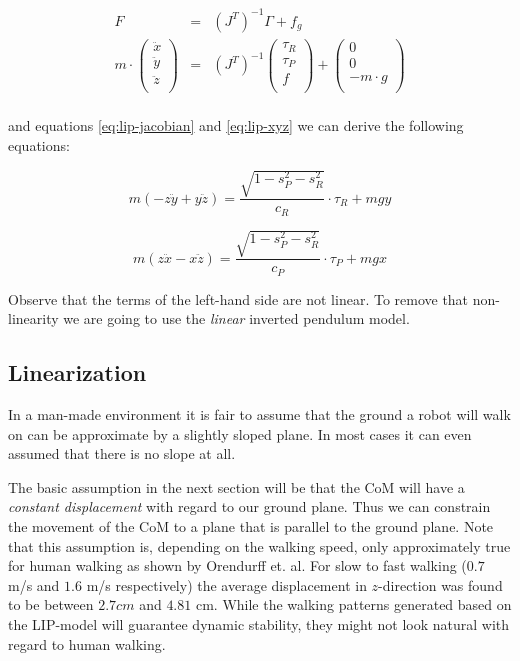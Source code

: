 \documentclass[english,ngerman]{KITreprt}
\begin{document}
\begin{equation}
\begin{array}{lcr}
F & = & (J^T)^{-1} \Gamma + f_g \\
m \cdot
\left(\begin{array}{c}
\ddot x \\
\ddot y \\
\ddot z \\
\end{array}\right)
& = & (J^T)^{-1}
\left(\begin{array}{c}
\tau_R \\
\tau_P \\
f \\
\end{array}\right)
+
\left(\begin{array}{c}
0 \\
0 \\
-m \cdot g \\
\end{array}\right) \\
\end{array}
\end{equation}

and equations \ref{eq:lip-jacobian} and \ref{eq:lip-xyz} we can derive
the following equations:

\begin{equation} \label{eq:lip-dyn-y}
m(-z\ddot{y} + y\ddot{z}) = \frac{\sqrt{1 - s_P^2 - s_R^2}}{c_R} \cdot \tau_R + m g y
\end{equation}

\begin{equation} \label{eq:lip-dyn-x}
m(z\ddot{x} - x\ddot{z}) = \frac{\sqrt{1 - s_P^2 - s_R^2}}{c_P} \cdot \tau_P + m g x
\end{equation}

Observe that the terms of the left-hand side are not linear. To remove
that non-linearity we are going to use the \emph{linear} inverted
pendulum model.

\subsection{Linearization}\label{linearization}

In a man-made environment it is fair to assume that the ground a robot
will walk on can be approximate by a slightly sloped plane. In most
cases it can even assumed that there is no slope at all.

The basic assumption in the next section will be that the CoM will have
a \emph{constant displacement} with regard to our ground plane. Thus we
can constrain the movement of the CoM to a plane that is parallel to the
ground plane. Note that this assumption is, depending on the walking
speed, only approximately true for human walking as shown by Orendurff
et. al. For slow to fast walking ($0.7$ m/s and $1.6$ m/s respectively)
the average displacement in $z$-direction was found to be between
$2.7cm$ and $4.81$ cm. While the walking patterns generated based on the
LIP-model will guarantee dynamic stability, they might not look natural
with regard to human walking.
\end{document}
